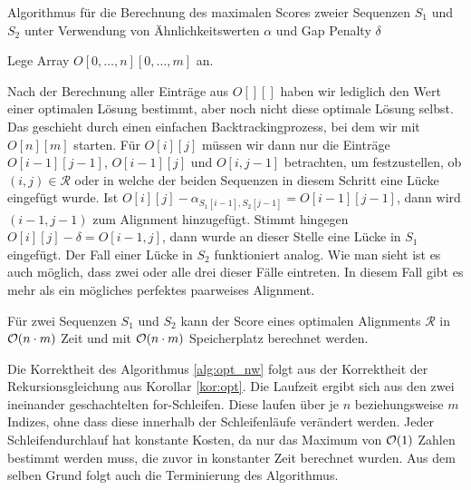 \begin{algorithm}
	\caption{Algorithmus für die Berechnung des maximalen Scores zweier Sequenzen $S_1$ und $S_2$ unter Verwendung von Ähnlichkeitswerten $\alpha$ und Gap Penalty $\delta$}
	\label{alg:opt_nw}
	\begin{algorithmic}[1]
		\State Lege Array $O[0,\dots,n][0,\dots,m]$ an.
		 
		\EndFor
		 
		\EndFor
		\EndFor
		\EndFor
		\EndProcedure
	\end{algorithmic}
\end{algorithm}

Nach der Berechnung aller Einträge aus $O[][]$ haben wir lediglich den Wert einer optimalen Lösung bestimmt, aber noch nicht diese optimale Lösung selbst. Das geschieht durch einen einfachen Backtrackingprozess, bei dem wir mit $O[n][m]$ starten. Für $O[i][j]$ müssen wir dann nur die Einträge $O[i-1][j-1]$, $O[i-1][j]$ und $O[i,j-1]$ betrachten, um festzustellen, ob $(i,j) \in \mathcal{R}$ oder in welche der beiden Sequenzen in diesem Schritt eine Lücke eingefügt wurde. Ist $O[i][j] - \alpha_{S_1[i-1],S_2[j-1]} = O[i-1][j-1]$, dann wird $(i-1,j-1)$ zum Alignment hinzugefügt. Stimmt hingegen $O[i][j] - \delta = O[i-1,j]$, dann wurde an dieser Stelle eine Lücke in $S_1$ eingefügt. Der Fall einer Lücke in $S_2$ funktioniert analog. Wie man sieht ist es auch möglich, dass zwei oder alle drei dieser Fälle eintreten. In diesem Fall gibt es mehr als ein mögliches perfektes paarweises Alignment. 

\begin{lemma}
	Für zwei Sequenzen $S_1$ und $S_2$ kann der Score eines optimalen Alignments $\mathcal{R}$ in $\mathcal{O}(n\cdot m)$ Zeit und mit $\mathcal{O}(n\cdot m)$ Speicherplatz berechnet werden.
\end{lemma}

\begin{beweis}
	Die Korrektheit des Algorithmus \ref{alg:opt_nw} folgt aus der Korrektheit der Rekursionsgleichung aus Korollar \ref{kor:opt}. Die Laufzeit ergibt sich aus den zwei ineinander geschachtelten for-Schleifen. Diese laufen über je $n$ beziehungsweise $m$ Indizes, ohne dass diese innerhalb der Schleifenläufe verändert werden. Jeder Schleifendurchlauf hat konstante Kosten, da nur das Maximum von $\mathcal{O}(1)$ Zahlen bestimmt werden muss, die zuvor in konstanter Zeit berechnet wurden. Aus dem selben Grund folgt auch die Terminierung des Algorithmus.
\end{beweis}

